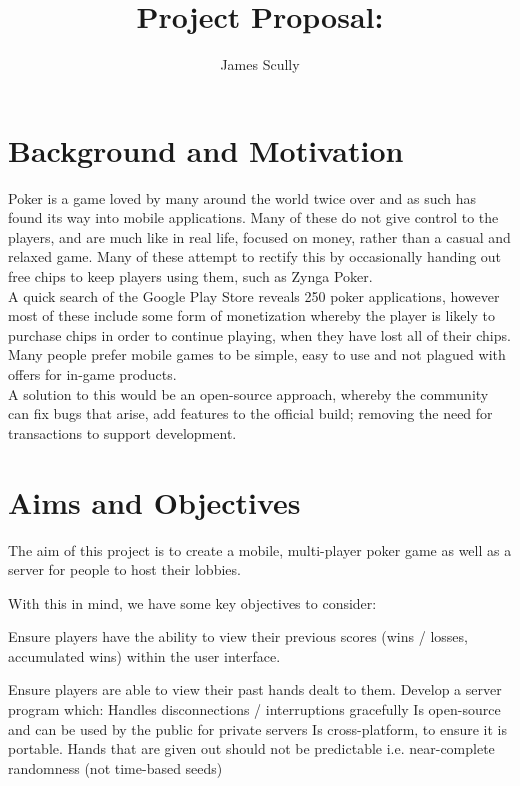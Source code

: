 \documentclass[11pt]{article}
\title{Project Proposal: \pt}
\author{James Scully}
\begin{document}
\maketitle

\section*{Background and Motivation}

Poker is a game loved by many around the world twice over and as such has found its way into mobile applications. Many of these do not give control to the players, and are much like in real life, focused on money, rather than a casual and relaxed game. Many of these attempt to rectify this by occasionally handing out free chips to keep players using them, such as Zynga Poker. \\

A quick search of the Google Play Store reveals 250 poker applications, however most of these include some form of monetization whereby the player is likely to purchase chips in order to continue playing, when they have lost all of their chips. Many people prefer mobile games to be simple, easy to use and not plagued with offers for in-game products.  \\

A solution to this would be an open-source approach, whereby the community can fix bugs that arise, add features to the official build; removing the need for transactions to support development. 




\newpage
\section*{Aims and Objectives}

The aim of this project is to create a mobile, multi-player poker game as well as a server for people to host their lobbies. 

With this in mind, we have some key objectives to consider: 

\begin{outline}

	\1 Ensure players have the ability to view their previous scores (wins / losses, accumulated wins) within the user interface.

	\1 Ensure players are able to view their past hands dealt to them. 
	\1 Develop a server program which: 
		\2 Handles disconnections / interruptions gracefully
		\2 Is open-source and can be used by the public for private servers
		\2 Is cross-platform, to ensure it is portable.
	\1 Hands that are given out should not be predictable i.e. near-complete randomness (not time-based seeds)
	
	


	
\end{outline}
\end{document}
